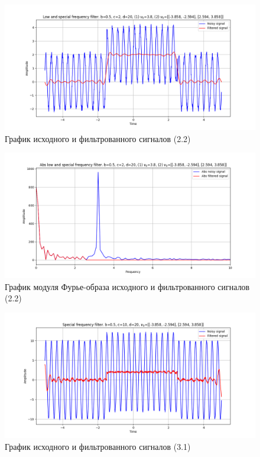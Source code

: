 \documentclass[a4paper, 12pt]{article}
\begin{document}
    \begin{figure}[H]
        \centering
        \includegraphics[scale=0.48]{2_nospec_nohigh.png}
        \captionsetup{skip=0pt}
        \caption{График исходного и фильтрованного сигналов (2.2)}
        \label{fig:fig772}
    \end{figure}
    \begin{figure}[H]
        \centering
        \includegraphics[scale=0.48]{2_abs_nospec_nohigh.png}
        \captionsetup{skip=0pt}
        \caption{График модуля Фурье-образа исходного и фильтрованного сигналов (2.2)}
        \label{fig:fig782}
    \end{figure}
    \begin{figure}[H]
        \centering
        \includegraphics[scale=0.48]{3_nospec.png}
        \captionsetup{skip=0pt}
        \caption{График исходного и фильтрованного сигналов (3.1)}
        \label{fig:fig7123}
    \end{figure}
\end{document}
